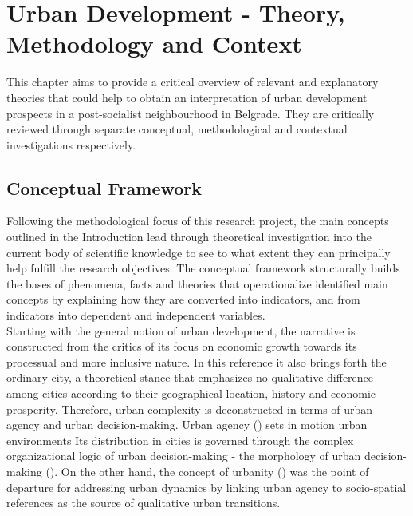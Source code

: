 \documentclass[11pt]{report}
\begin{document}

\chapter{Urban Development - Theory, Methodology and Context}


This chapter aims to provide a critical overview of relevant and explanatory theories that could help to obtain an interpretation of urban development prospects in a post-socialist neighbourhood in Belgrade.
They are critically reviewed through separate conceptual, methodological and contextual investigations respectively.

\section{Conceptual Framework}

Following the methodological focus of this research project, the main concepts outlined in the Introduction lead through theoretical investigation into the current body of scientific knowledge to see to what extent they can principally help fulfill the research objectives. 
The conceptual framework structurally builds the bases of phenomena, facts and theories that operationalize identified main concepts by explaining how they are converted into indicators, and from indicators into dependent and independent variables.
\\

Starting with the general notion of urban development, the narrative is constructed from the critics of its focus on economic growth towards its processual and more inclusive nature.
In this reference it also brings forth the ordinary city, a theoretical stance that emphasizes no qualitative difference among cities according to their geographical location, history and economic prosperity.
Therefore, urban complexity is deconstructed in terms of urban agency and urban decision-making.
Urban agency (\href{ref}{\citealt{all ref????}}) sets in motion urban environments
Its distribution in cities is governed through the complex organizational logic of urban decision-making - the morphology of urban decision-making (\href{ref}{\citealt{all ref????}}).
On the other hand, the concept of urbanity (\href{ref}{\citealt{all ref????}}) was the point of departure for addressing urban dynamics by linking urban agency to socio-spatial references as the source of qualitative urban transitions.
\\
\end{document}
